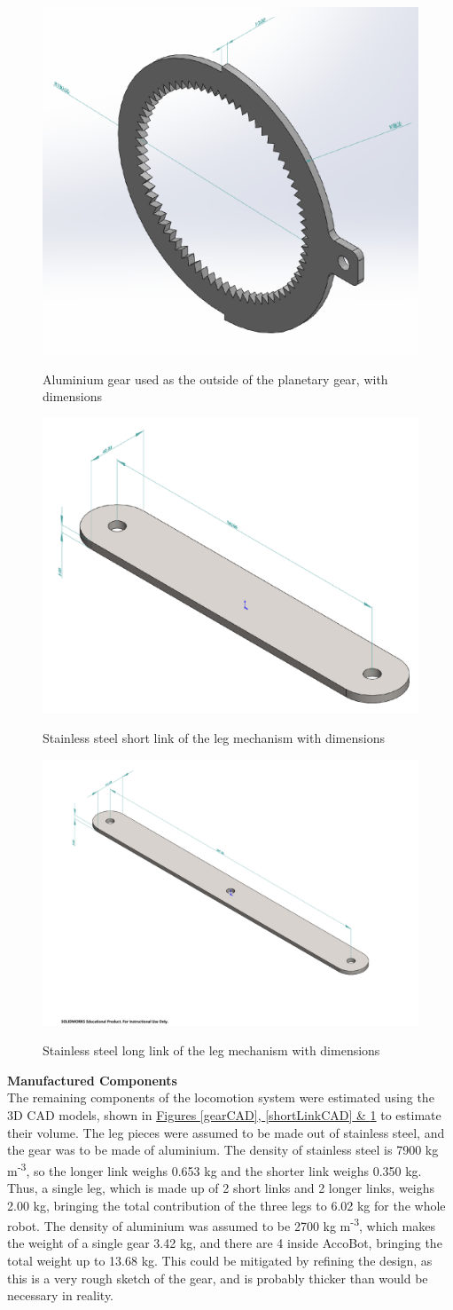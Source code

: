 \documentclass[11pt]{article}		%
\newcommand{\supercite}[1]{\textsuperscript{\cite{#1}}}		%
\begin{document}
			\begin{figure}[h]
				\centering
				\begin{multicols}{3}
					\includegraphics[height=0.2\textwidth]{gearCAD}
					\caption{Aluminium gear used as the outside of the planetary gear, with dimensions}
					\label{gearCAD}
					\columnbreak
					\includegraphics[height=0.2\textwidth]{shortLinkCAD}
					\caption{Stainless steel short link of the leg mechanism with dimensions}
					\label{shortLinkCAD}
					\columnbreak
					\includegraphics[height=0.2\textwidth]{longLinkCAD}
					\caption{Stainless steel long link of the leg mechanism with dimensions}
					\label{longLinkCAD}
				\end{multicols}
			\end{figure}

			\textbf{Manufactured Components}
			\\
			The remaining components of the locomotion system were estimated using the 3D CAD models, shown in \hyperref[gearCAD]{Figures \ref*{gearCAD}, \ref*{shortLinkCAD} \& \ref*{longLinkCAD}} to estimate their volume.
			The leg pieces were assumed to be made out of stainless steel, and the gear was to be made of aluminium.
			The density of stainless steel is 7900 kg m\textsuperscript{-3}\supercite{HLT}, so the longer link weighs 0.653 kg and the shorter link weighs 0.350 kg.
			Thus, a single leg, which is made up of 2 short links and 2 longer links, weighs 2.00 kg, bringing the total contribution of the three legs to 6.02 kg for the whole robot.
			The density of aluminium was assumed to be 2700 kg m\textsuperscript{-3}\supercite{HLT}, which makes the weight of a single gear 3.42 kg, and there are 4 inside AccoBot, bringing the total weight up to 13.68 kg.
			This could be mitigated by refining the design, as this is a very rough sketch of the gear, and is probably thicker than would be necessary in reality.
		
\end{document}
